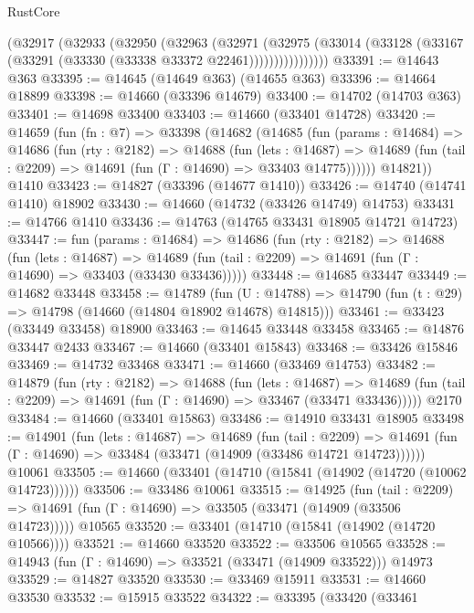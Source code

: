 \begin{lexlean}{RustCore}
\begin{coremodule}
            (@32917
              (@32933
                (@32950
                  (@32963
                    (@32971
                      (@32975
                        (@33014
                          (@33128 (@33167 (@33291 (@33330 (@33338 @33372 @22461))))))))))))))))
@33391 := @14643 @363
@33395 := @14645 (@14649 @363) (@14655 @363)
@33396 := @14664 @18899
@33398 := @14660 (@33396 @14679)
@33400 := @14702 (@14703 @363)
@33401 := @14698 @33400
@33403 := @14660 (@33401 @14728)
@33420 := @14659
    (fun (fn : @7) =>
    @33398
      (@14682
        (@14685
          (fun (params : @14684) =>
          @14686
            (fun (rty : @2182) =>
            @14688
              (fun (lets : @14687) =>
              @14689 (fun (tail : @2209) => @14691 (fun (Γ : @14690) => @33403 @14775))))))
        @14821))
    @1410
@33423 := @14827 (@33396 (@14677 @1410))
@33426 := @14740 (@14741 @1410) @18902
@33430 := @14660 (@14732 (@33426 @14749) @14753)
@33431 := @14766 @1410
@33436 := @14763 (@14765 @33431 @18905 @14721 @14723)
@33447 := fun (params : @14684) =>
  @14686
    (fun (rty : @2182) =>
    @14688
      (fun (lets : @14687) =>
      @14689 (fun (tail : @2209) => @14691 (fun (Γ : @14690) => @33403 (@33430 @33436)))))
@33448 := @14685 @33447
@33449 := @14682 @33448
@33458 := @14789
    (fun (U : @14788) => @14790 (fun (t : @29) => @14798 (@14660 (@14804 @18902 @14678) @14815)))
@33461 := @33423 (@33449 @33458) @18900
@33463 := @14645 @33448 @33458
@33465 := @14876 @33447 @2433
@33467 := @14660 (@33401 @15843)
@33468 := @33426 @15846
@33469 := @14732 @33468
@33471 := @14660 (@33469 @14753)
@33482 := @14879
    (fun (rty : @2182) =>
    @14688
      (fun (lets : @14687) =>
      @14689 (fun (tail : @2209) => @14691 (fun (Γ : @14690) => @33467 (@33471 @33436)))))
    @2170
@33484 := @14660 (@33401 @15863)
@33486 := @14910 @33431 @18905
@33498 := @14901
    (fun (lets : @14687) =>
    @14689
      (fun (tail : @2209) =>
      @14691 (fun (Γ : @14690) => @33484 (@33471 (@14909 (@33486 @14721 @14723))))))
    @10061
@33505 := @14660 (@33401 (@14710 (@15841 (@14902 (@14720 (@10062 @14723))))))
@33506 := @33486 @10061
@33515 := @14925
    (fun (tail : @2209) => @14691 (fun (Γ : @14690) => @33505 (@33471 (@14909 (@33506 @14723)))))
    @10565
@33520 := @33401 (@14710 (@15841 (@14902 (@14720 @10566))))
@33521 := @14660 @33520
@33522 := @33506 @10565
@33528 := @14943 (fun (Γ : @14690) => @33521 (@33471 (@14909 @33522))) @14973
@33529 := @14827 @33520
@33530 := @33469 @15911
@33531 := @14660 @33530
@33532 := @15915 @33522
@34322 := @33395
    (@33420
      (@33461

\end{coremodule}
\end{lexlean}
